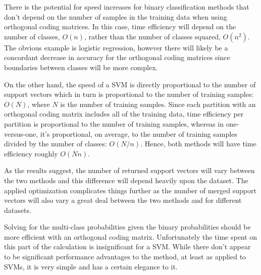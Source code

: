 There is the potential for speed increases for binary classification methods
that don't depend on the number of samples in the training data when using
orthogonal coding matrices.
In this case, time efficiency will depend on the number of classes,
$O(n)$, rather than the number of classes squared, $O(n^2)$.
The obvious example is logistic regression, however there will likely be
a concordant decrease in accuracy for the orthogonal coding matrices since
boundaries between classes will be more complex.

On the other hand, the speed of a SVM is directly proportional to the number 
of support vectors which in turn is proportional to the number of training samples: 
$O(N)$, where $N$ is the number of training samples.
Since each partition with an orthogonal coding matrix includes all of the
training data, time efficiency per partition is proportional to the number
of training samples, whereas in one-versus-one, it's proportional, on average,
to the number of training samples divided by the number of classes: $O(N/n)$.
Hence, both methods will have time efficiency roughly $O(Nn)$.

As the results suggest, the number of returned support vectors will vary 
between the two methods and this difference will depend heavily upon the 
dataset.
The applied optimization complicates things further as the number of merged
support vectors will also vary a great deal between the two methods and
for different datasets.

Solving for the multi-class probabilities given the binary probabilities should
be more efficient with an orthogonal coding matrix. 
Unfortunately the time
spent on this part of the calculation is insignificant for a SVM.
While there don't appear to be significant performance advantages to the method,
at least as applied to SVMs, 
it is very simple and has a certain elegance to it.

